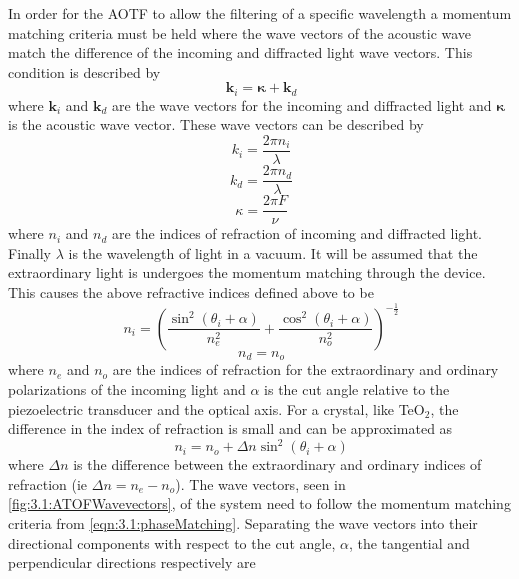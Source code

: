 In order for the AOTF to allow the filtering of a specific wavelength a momentum matching criteria must be held where the wave vectors of the acoustic wave match the difference of the incoming and diffracted light wave vectors. This condition is described by
\begin{equation}
    \ \mathbf{k}_{i} = \boldsymbol\kappa + \mathbf{k}_{d}
    \label{eqn:3.1:phaseMatching}
\end{equation}
where $\mathbf{k}_{i}$ and $\mathbf{k}_{d}$ are the wave vectors for the incoming and diffracted light and $\boldsymbol\kappa$ is the acoustic wave vector. These wave vectors can be described by
\begin{equation}
    \ k_{i} = \frac{2\pi n_{i}}{\lambda}
    \label{eqn:3.1:incomingWavevector}
\end{equation}
\begin{equation}
    \ k_{d} = \frac{2\pi n_{d}}{\lambda}
    \label{eqn:3.1:diffractedWavevector}
\end{equation}
\begin{equation}
    \ \kappa = \frac{2\pi F}{\nu}
    \label{eqn:3.1:acousticWavevector}
\end{equation}
where $n_{i}$ and $n_{d}$ are the indices of refraction of incoming and diffracted light. Finally $\lambda$ is the wavelength of light in a vacuum. It will be assumed that the extraordinary light is undergoes the momentum matching through the device. This causes the above refractive indices defined above to be
\begin{equation}
    \ n_{i} = \left( \frac{\sin^{2}(\theta_{i}+\alpha)}{n_{e}^{2}} + \frac{\cos^{2}(\theta_{i}+\alpha)}{n_{o}^{2}} \right)^{-\frac{1}{2}}
    \label{eqn:3.1:incomingIndexOfRefraction}
\end{equation}
\begin{equation}
    \ n_{d} = n_{o}
    \label{eqn:3.1:diffractedIndexOfRefraction}
\end{equation}
where $n_{e}$ and $n_{o}$ are the indices of refraction for the extraordinary and ordinary polarizations of the incoming light and $\alpha$ is the cut angle relative to the piezoelectric transducer and the optical axis. For a crystal, like TeO$_{2}$, the difference in the index of refraction is small and can be approximated as \citep{Voloshinov2007}
 \begin{equation}
    \ n_{i} = n_{o} + \Delta n\sin^{2}(\theta_{i}+\alpha)
    \label{eqn:3.1:incomingIndexOfRefractionApprox}
\end{equation}
where $\Delta n$ is the difference between the extraordinary and ordinary indices of refraction (ie $\Delta n = n_{e} - n_{o}$). The wave vectors, seen in \autoref{fig:3.1:ATOFWavevectors}, of the system need to follow the momentum matching criteria from \autoref{eqn:3.1:phaseMatching}. Separating the wave vectors into their directional components with respect to the cut angle, $\alpha$, the tangential and perpendicular directions respectively are
